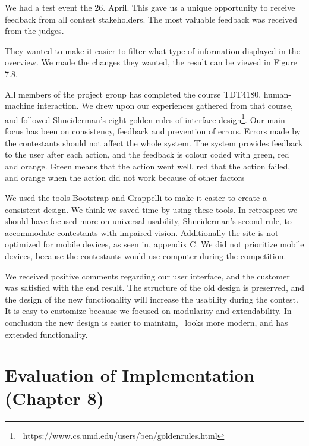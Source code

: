 We had a test event the 26. April. This gave us a unique opportunity to
receive feedback from all contest stakeholders. The most valuable
feedback was received from the judges.

They wanted to make it easier to filter what type of information
displayed in the overview. We made the changes they wanted, the result
can be viewed in Figure 7.8. 

All members of the project group has completed the course TDT4180,
human-machine interaction. We drew upon our experiences gathered from
that course, and followed Shneiderman{\textquoteright}s eight golden
rules of interface
design\footnote{\ https://www.cs.umd.edu/users/ben/goldenrules.html}.
Our main focus has been on consistency, feedback and prevention of
errors. Errors made by the contestants should not affect the whole
system. The system provides feedback to the user after each action, and
the feedback is colour coded with green, red and orange. Green means
that the action went well, red that the action failed, and orange when
the action did not work because of other factors

We used the tools Bootstrap and Grappelli to make it easier to create a
consistent design. We think we saved time by using these tools. In
retrospect we should have focused more on universal usability,
Shneiderman's second rule, to accommodate contestants
with impaired vision. Additionally the site is not optimized for mobile
devices, as seen in, appendix C. We did not prioritize mobile devices,
because the contestants would use computer during the competition. 

We received positive comments regarding our user interface, and the
customer was satisfied with the end result. The structure of the old
design is preserved, and the design of the new functionality will
increase the usability during the contest. It is easy to customize
because we focused on modularity and extendability. In conclusion the
new design is easier to maintain, \ looks more modern, and has extended
functionality. \ 

\pagebreak
\section{Evaluation of Implementation (Chapter 8)}


